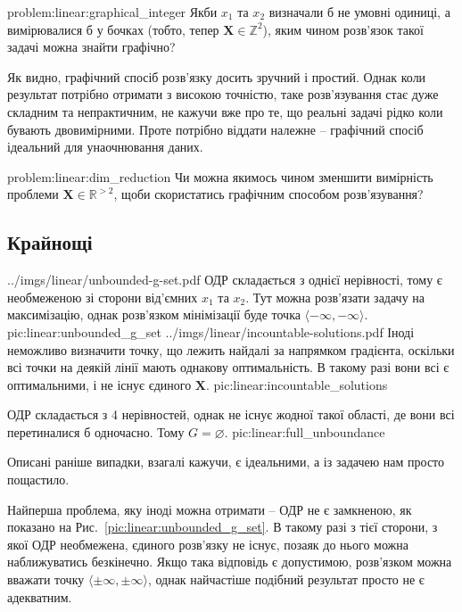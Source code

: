 \documentclass[\main/book.tex]{subfiles}
\begin{document}
\begin{problem}{problem:linear:graphical_integer}
 Якби $x_1$ та $x_2$ визначали б не умовні одиниці, а вимірювалися б у бочках (тобто, тепер $\mathbf{X} \in \mathbb{Z}^2$), яким чином розв'язок такої задачі можна знайти графічно?
\end{problem}

Як видно, графічний спосіб розв'язку досить зручний і простий. Однак коли результат потрібно отримати з високою точністю, таке роз\-в'я\-зу\-ван\-ня стає дуже складним та непрактичним, не кажучи вже про те, що реальні задачі рідко коли бувають двовимірними. Проте потрібно віддати належне -- графічний спосіб ідеальний для унаочнювання даних.

\begin{problem}{problem:linear:dim_reduction}
 Чи можна якимось чином зменшити вимірність проблеми ${\mathbf{X} \in \mathbb{R}^{> 2}}$, щоби скористатись графічним способом розв'язування?
\end{problem}


\subsection{Крайнощі}

\twocolminipage
 {
  \nofigillustration
   {../imgs/linear/unbounded-g-set.pdf}
   {ОДР складається з однієї нерівності, тому є необмеженою зі сторони від'ємних $x_1$ та $x_2$. Тут можна розв'язати задачу на максимізацію, однак розв'язком мінімізації буде точка ${\langle -\infty, -\infty \rangle}$.}
   {pic:linear:unbounded_g_set}
 }{
  \nofigillustration
   {../imgs/linear/incountable-solutions.pdf}
   {Іноді неможливо визначити точку, що лежить найдалі за напрямком градієнта, оскільки всі точки на деякій лінії мають однакову оптимальність. В такому разі вони всі є оптимальними, і не існує єдиного $\mathbf{X}$.}
   {pic:linear:incountable_solutions}
 }

 {ОДР складається з 4 нерівностей, однак не існує жодної такої області, де вони всі перетиналися б одночасно. Тому $G = \varnothing$.}
 {pic:linear:full_unboundance}

Описані раніше випадки, взагалі кажучи, є ідеальними, а із задачею нам просто пощастило.

Найперша проблема, яку іноді можна отримати -- ОДР не є замкненою, як показано на Рис.~\ref{pic:linear:unbounded_g_set}. В такому разі з тієї сторони, з якої ОДР необмежена, єдиного розв'язку не існує, позаяк до нього можна наближуватись безкінечно. Якщо така відповідь є допустимою, розв'язком можна вважати точку ${\langle \pm \infty, \pm \infty \rangle}$, однак найчастіше подібний результат просто не є адекватним.
\end{document}
